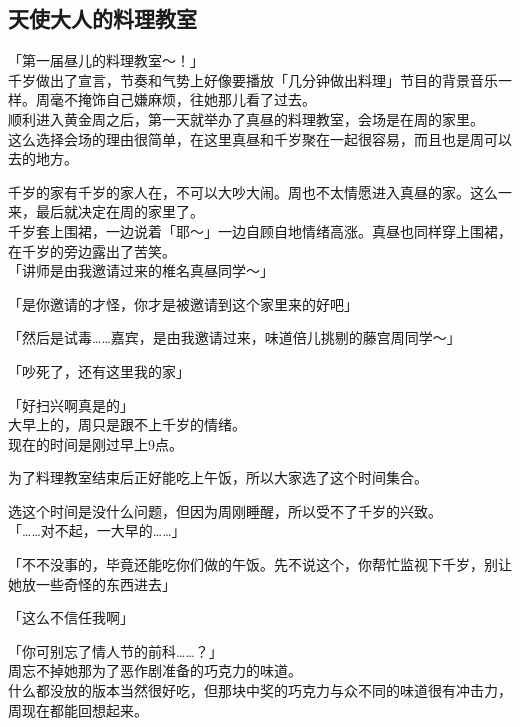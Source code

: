 \subsection{天使大人的料理教室}

「第一届昼儿的料理教室～！」\\

千岁做出了宣言，节奏和气势上好像要播放「几分钟做出料理」节目的背景音乐一样。周毫不掩饰自己嫌麻烦，往她那儿看了过去。\\

顺利进入黄金周之后，第一天就举办了真昼的料理教室，会场是在周的家里。\\

这么选择会场的理由很简单，在这里真昼和千岁聚在一起很容易，而且也是周可以去的地方。

千岁的家有千岁的家人在，不可以大吵大闹。周也不太情愿进入真昼的家。这么一来，最后就决定在周的家里了。\\

千岁套上围裙，一边说着「耶～」一边自顾自地情绪高涨。真昼也同样穿上围裙，在千岁的旁边露出了苦笑。\\

「讲师是由我邀请过来的椎名真昼同学～」

「是你邀请的才怪，你才是被邀请到这个家里来的好吧」

「然后是试毒……嘉宾，是由我邀请过来，味道倍儿挑剔的藤宫周同学～」

「吵死了，还有这里我的家」

「好扫兴啊真是的」\\

大早上的，周只是跟不上千岁的情绪。\\

现在的时间是刚过早上9点。

为了料理教室结束后正好能吃上午饭，所以大家选了这个时间集合。

选这个时间是没什么问题，但因为周刚睡醒，所以受不了千岁的兴致。\\

「……对不起，一大早的……」

「不不没事的，毕竟还能吃你们做的午饭。先不说这个，你帮忙监视下千岁，别让她放一些奇怪的东西进去」

「这么不信任我啊」

「你可别忘了情人节的前科……？」\\

周忘不掉她那为了恶作剧准备的巧克力的味道。\\

什么都没放的版本当然很好吃，但那块中奖的巧克力与众不同的味道很有冲击力，周现在都能回想起来。

